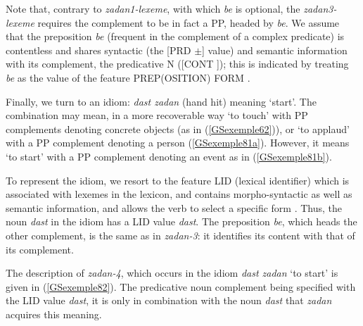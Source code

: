 \documentclass[output=paper
                ,modfonts
                ,nonflat
	        ,collection
	        ,collectionchapter
	        ,collectiontoclongg
 	        ,biblatex
                ,babelshorthands
                ,newtxmath
                ,draftmode
                ,colorlinks, citecolor=brown
]{./langsci/langscibook}
\begin{document}
{Note that, contrary to \emph{zadan1-lexeme}, with which \emph{be} is optional, the \emph{zadan3-lexeme} requires the complement to be in fact a PP, headed by \emph{be}. We assume that the preposition \emph{be} (frequent in the complement of a complex predicate) is contentless and shares syntactic (the [PRD $\pm$] value) and semantic information with its complement, the predicative N ([CONT ]); this is indicated by treating \emph{be} as the value of the feature PREP(OSITION) FORM \citep[Chapter~3]{ps}.  

Finally, we turn to an idiom: \emph{dast zadan} (hand hit) meaning `start'. The combination may mean, in a more recoverable way `to touch' with PP complements denoting concrete objects (as in (\ref{GSexemple62})), or `to applaud' with a PP complement denoting a person (\ref{GSexemple81a}). However, it means `to start' with a PP complement denoting an event as in (\ref{GSexemple81b}).

\eal
	\label{GSexemple81} 
	\label{GSexemple81a}
		
    \label{GSexemple81b}
\zl

To represent the idiom, we resort to the feature LID (lexical identifier) which is associated with lexemes in the lexicon, and contains morpho-syntactic as well as semantic information, and allows the verb to select a specific form \citep{Sag2007a, Sag2012a}. Thus, the noun \emph{dast} in the idiom has a LID value \emph{dast}. The preposition \emph{be}, which heads the other complement, is the same as in \emph{zadan-3}: it identifies its content with that of its complement.

The description of \emph{zadan-4}, which occurs in the idiom \emph{dast zadan} `to start' is given in (\ref{GSexemple82}). The predicative noun complement being specified with the LID value \emph{dast}, it is only in combination with the noun \emph{dast} that \emph{zadan} acquires this meaning.


}
\end{document}
